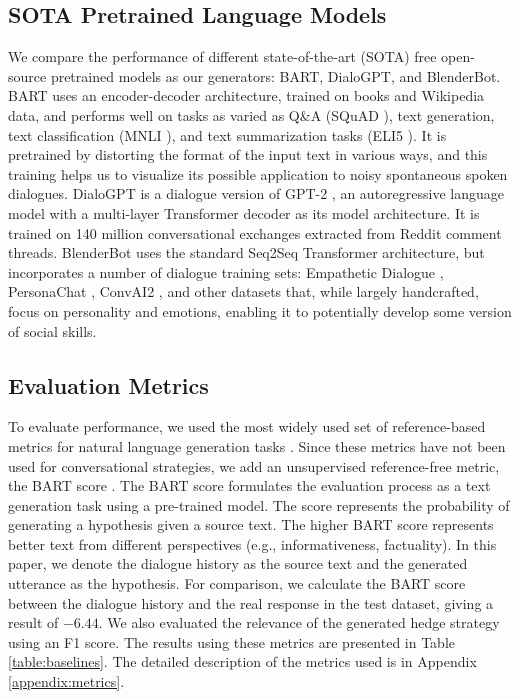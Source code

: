 \documentclass[11pt]{article}
\begin{document}
\subsection{SOTA Pretrained Language Models} \label{sota}
We compare the performance of different state-of-the-art (SOTA) free open-source pretrained models as our generators: BART, DialoGPT, and BlenderBot. %
BART \citep{lewis2019bart} uses an encoder-decoder architecture, trained on books and Wikipedia data, and performs well on tasks as varied as Q\&A (SQuAD \citep{rajpurkar-etal-2016-squad}), text generation, text classification (MNLI \citep{williams-etal-2018-broad} ), and text summarization tasks (ELI5 \citep{fan-etal-2019-eli5}). It is pretrained by distorting the format of the input text in various ways, and this training helps us to visualize its possible application to noisy spontaneous spoken dialogues. DialoGPT \citep{zhang2019dialogpt} is a dialogue version of GPT-2 \citep{radford2019language}, an autoregressive language model with a multi-layer Transformer \citep{vaswani2017attention} decoder as its model architecture. It is trained on 140 million conversational exchanges extracted from Reddit comment threads. BlenderBot \citep{roller2020recipes} uses the standard Seq2Seq Transformer architecture, but incorporates a number of dialogue training sets: Empathetic Dialogue \citep{rashkin2019towards}, PersonaChat \citep{zhang-etal-2018-personalizing}, ConvAI2 \citep{dinan2020second}, and other datasets that, while largely handcrafted, focus on personality and emotions, enabling it to potentially develop some version of social skills.

\subsection{Evaluation Metrics}

To evaluate performance, we used the most widely used set of reference-based metrics for natural language generation tasks \citep{liu2021towards, ziems-etal-2022-inducing}. Since these metrics have not been used for conversational strategies, we add an unsupervised reference-free metric, the BART score \citep{yuan2021bartscore}. The BART score formulates the evaluation process as a text generation task using a pre-trained model. The score represents the probability of generating a hypothesis given a source text. The higher BART score represents better text from different perspectives (e.g., informativeness, factuality). In this paper, we denote the dialogue history as the source text and the generated utterance as the hypothesis. For comparison, we calculate the BART score between the dialogue history and the real response in the test dataset, giving a result of  $-6.44$. We also evaluated the relevance of the generated hedge strategy using an F1 score. The results using these metrics are presented in Table \ref{table:baselines}. The detailed description of the metrics used is in Appendix \ref{appendix:metrics}. 
\end{document}
